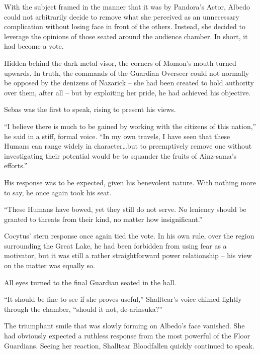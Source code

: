  

With the subject framed in the manner that it was by Pandora’s Actor, Albedo could not arbitrarily decide to remove what she perceived as an unnecessary complication without losing face in front of the others. Instead, she decided to leverage the opinions of those seated around the audience chamber. In short, it had become a vote.

 

Hidden behind the dark metal visor, the corners of Momon’s mouth turned upwards. In truth, the commands of the Guardian Overseer could not normally be opposed by the denizens of Nazarick – she had been created to hold authority over them, after all – but by exploiting her pride, he had achieved his objective.

 

Sebas was the first to speak, rising to present his views.

 

“I believe there is much to be gained by working with the citizens of this nation,” he said in a stiff, formal voice. “In my own travels, I have seen that these Humans can range widely in character…but to preemptively remove one without investigating their potential would be to squander the fruits of Ainz-sama’s efforts.”

 

His response was to be expected, given his benevolent nature. With nothing more to say, he once again took his seat.

 

“These Humans have bowed, yet they still do not serve. No leniency should be granted to threats from their kind, no matter how insignificant.”

 

Cocytus’ stern response once again tied the vote. In his own rule, over the region surrounding the Great Lake, he had been forbidden from using fear as a motivator, but it was still a rather straightforward power relationship – his view on the matter was equally so.

 

All eyes turned to the final Guardian seated in the hall.

 

“It should be fine to see if she proves useful,” Shalltear’s voice chimed lightly through the chamber, “should it not, de-arinsuka?”

 

The triumphant smile that was slowly forming on Albedo’s face vanished. She had obviously expected a ruthless response from the most powerful of the Floor Guardians. Seeing her reaction, Shalltear Bloodfallen quickly continued to speak.

